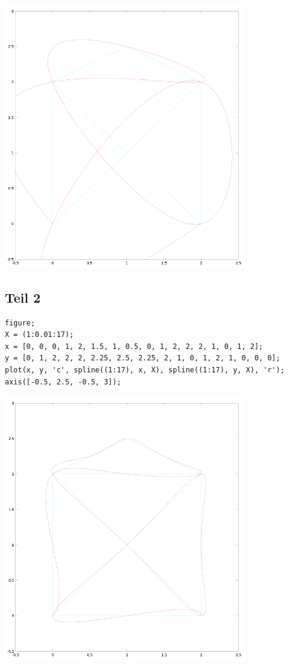 \documentclass[10pt,a4paper]{article}
\begin{document}
\includegraphics[width=300pt]{4_16_1.png}

\subsection{Teil 2}

\begin{lstlisting}
figure;
X = (1:0.01:17);
x = [0, 0, 0, 1, 2, 1.5, 1, 0.5, 0, 1, 2, 2, 2, 1, 0, 1, 2];
y = [0, 1, 2, 2, 2, 2.25, 2.5, 2.25, 2, 1, 0, 1, 2, 1, 0, 0, 0];
plot(x, y, 'c', spline((1:17), x, X), spline((1:17), y, X), 'r');
axis([-0.5, 2.5, -0.5, 3]);
\end{lstlisting}

\includegraphics[width=300pt]{4_16_2.png}
\end{document}
